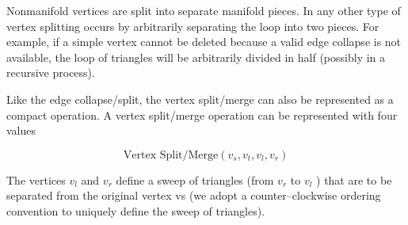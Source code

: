 \begin{description}
Nonmanifold vertices are split into separate manifold pieces. In any other type of vertex splitting occurs by arbitrarily separating the loop into two pieces. For example, if a simple vertex cannot be deleted because a valid edge collapse is not available, the loop of triangles will be arbitrarily divided in half (possibly in a recursive process).

Like the edge collapse/split, the vertex split/merge can also be represented as a compact operation. A vertex split/merge operation can be represented with four values

\begin{equation}\label{eq:9.18}
\text{Vertex Split/Merge}(v_s, v_t, v_l, v_r)
\end{equation}

The vertices $v_l$ and $v_r$ define a sweep of triangles (from $v_r$ to $v_l$ ) that are to be separated from the original vertex vs (we adopt a counter--clockwise ordering convention to uniquely define the sweep of triangles).


\end{description}

